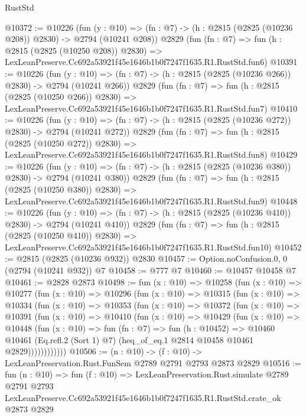 \begin{lexlean}{RustStd}
\begin{coremodule}
@10372 := @10226
    (fun (y : @10) => (fn : @7) -> (h : @2815 (@2825 (@10236 @208)) @2830) -> @2794 (@10241 @208))
    @2829
    (fun (fn : @7) =>
    fun (h : @2815 (@2825 (@10250 @208)) @2830) =>
    LexLeanPreserve.Cc692a53921f45e1646b1b0f7247f1635.R1.RustStd.fun6)
@10391 := @10226
    (fun (y : @10) => (fn : @7) -> (h : @2815 (@2825 (@10236 @266)) @2830) -> @2794 (@10241 @266))
    @2829
    (fun (fn : @7) =>
    fun (h : @2815 (@2825 (@10250 @266)) @2830) =>
    LexLeanPreserve.Cc692a53921f45e1646b1b0f7247f1635.R1.RustStd.fun7)
@10410 := @10226
    (fun (y : @10) => (fn : @7) -> (h : @2815 (@2825 (@10236 @272)) @2830) -> @2794 (@10241 @272))
    @2829
    (fun (fn : @7) =>
    fun (h : @2815 (@2825 (@10250 @272)) @2830) =>
    LexLeanPreserve.Cc692a53921f45e1646b1b0f7247f1635.R1.RustStd.fun8)
@10429 := @10226
    (fun (y : @10) => (fn : @7) -> (h : @2815 (@2825 (@10236 @380)) @2830) -> @2794 (@10241 @380))
    @2829
    (fun (fn : @7) =>
    fun (h : @2815 (@2825 (@10250 @380)) @2830) =>
    LexLeanPreserve.Cc692a53921f45e1646b1b0f7247f1635.R1.RustStd.fun9)
@10448 := @10226
    (fun (y : @10) => (fn : @7) -> (h : @2815 (@2825 (@10236 @410)) @2830) -> @2794 (@10241 @410))
    @2829
    (fun (fn : @7) =>
    fun (h : @2815 (@2825 (@10250 @410)) @2830) =>
    LexLeanPreserve.Cc692a53921f45e1646b1b0f7247f1635.R1.RustStd.fun10)
@10452 := @2815 (@2825 (@10236 @932)) @2830
@10457 := Option.noConfusion.{0, 0} (@2794 (@10241 @932)) @7
@10458 := @777 @7
@10460 := @10457 @10458 @7
@10461 := @2828 @2873
@10498 := fun (x : @10) =>
  @10258
    (fun (x : @10) =>
    @10277
      (fun (x : @10) =>
      @10296
        (fun (x : @10) =>
        @10315
          (fun (x : @10) =>
          @10334
            (fun (x : @10) =>
            @10353
              (fun (x : @10) =>
              @10372
                (fun (x : @10) =>
                @10391
                  (fun (x : @10) =>
                  @10410
                    (fun (x : @10) =>
                    @10429
                      (fun (x : @10) =>
                      @10448
                        (fun (x : @10) =>
                        fun (fn : @7) =>
                        fun (h : @10452) =>
                        @10460
                          @10461
                          (Eq.refl.{2} (Sort 1) @7)
                          (heq_of_eq.{1} @2814 @10458 @10461 @2829))))))))))))
@10506 := (n : @10) -> (f : @10) -> LexLeanPreservation.Rust.FunSem @2789 @2791 @2793 @2873 @2829
@10516 := fun (n : @10) =>
  fun (f : @10) =>
  LexLeanPreservation.Rust.simulate
    @2789
    @2791
    @2793
    LexLeanPreserve.Cc692a53921f45e1646b1b0f7247f1635.R1.RustStd.crate_ok
    @2873
    @2829
\end{coremodule}
\end{lexlean}
